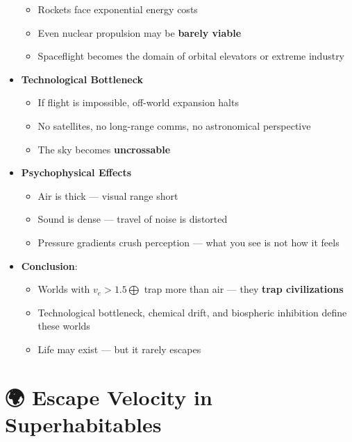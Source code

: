 \documentclass[
  letterpaper,
]{book}
\providecommand{\tightlist}{%
  \setlength{\itemsep}{0pt}\setlength{\parskip}{0pt}}
\begin{document}
\begin{itemize}
  \begin{itemize}
  \tightlist
  \item
    Rockets face exponential energy costs
  \item
    Even nuclear propulsion may be \textbf{barely viable}
  \item
    Spaceflight becomes the domain of orbital elevators or extreme
    industry
  \end{itemize}
\item
  \textbf{Technological Bottleneck}

  \begin{itemize}
  \tightlist
  \item
    If flight is impossible, off-world expansion halts
  \item
    No satellites, no long-range comms, no astronomical perspective
  \item
    The sky becomes \textbf{uncrossable}
  \end{itemize}
\item
  \textbf{Psychophysical Effects}

  \begin{itemize}
  \tightlist
  \item
    Air is thick --- visual range short
  \item
    Sound is dense --- travel of noise is distorted
  \item
    Pressure gradients crush perception --- what you see is not how it
    feels
  \end{itemize}
\item
  \textbf{Conclusion}:

  \begin{itemize}
  \tightlist
  \item
    Worlds with \(v_e > 1.5⨁\) trap more than air --- they \textbf{trap
    civilizations}\\
  \item
    Technological bottleneck, chemical drift, and biospheric inhibition
    define these worlds\\
  \item
    Life may exist --- but it rarely escapes
  \end{itemize}
\end{itemize}

\section{🌍 Escape Velocity in
Superhabitables}\label{escape-velocity-in-superhabitables}
\end{document}
